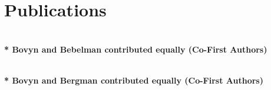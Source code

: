 \documentclass[letterpaper,10pt]{article} %
\begin{document}
\bigskip


\section{Publications}
\bigskip

\begin{description}[itemsep=-1ex]
\item {}
\item {}
\item {}
\item {}
\\ \textbf{\** Bovyn and Bebelman contributed equally (Co-First Authors)}
\item {}
\item {}
\item {}
\item {}
\item {}
\item {}
\item {} \\ \textbf{\** Bovyn and Bergman contributed equally (Co-First Authors)}
\item {}
\item {}


\end{description}
\end{document}
